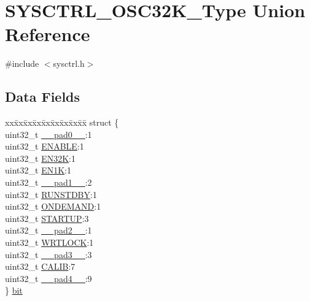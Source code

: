\hypertarget{union_s_y_s_c_t_r_l___o_s_c32_k___type}{}\section{S\+Y\+S\+C\+T\+R\+L\+\_\+\+O\+S\+C32\+K\+\_\+\+Type Union Reference}
\label{union_s_y_s_c_t_r_l___o_s_c32_k___type}


{\ttfamily \#include $<$sysctrl.\+h$>$}

\subsection*{Data Fields}
\begin{DoxyCompactItemize}
\item 
\begin{tabbing}
xx\=xx\=xx\=xx\=xx\=xx\=xx\=xx\=xx\=\kill
struct \{\\
\>uint32\_t \mbox{\hyperlink{union_s_y_s_c_t_r_l___o_s_c32_k___type_a3e57c2ef1c3ffb36722f000cc1156824}{\_\_pad0\_\_}}:1\\
\>uint32\_t \mbox{\hyperlink{union_s_y_s_c_t_r_l___o_s_c32_k___type_a66f979832c85e0692bd9422b05aff1f7}{ENABLE}}:1\\
\>uint32\_t \mbox{\hyperlink{union_s_y_s_c_t_r_l___o_s_c32_k___type_a51bee596c7082cd6a41e8ffc72d0f972}{EN32K}}:1\\
\>uint32\_t \mbox{\hyperlink{union_s_y_s_c_t_r_l___o_s_c32_k___type_aa24d798a72c55bfe5d16b3b239aaf38d}{EN1K}}:1\\
\>uint32\_t \mbox{\hyperlink{union_s_y_s_c_t_r_l___o_s_c32_k___type_a6712ba6dd1d5b43d2d56ff8ac4e275a7}{\_\_pad1\_\_}}:2\\
\>uint32\_t \mbox{\hyperlink{union_s_y_s_c_t_r_l___o_s_c32_k___type_a5656560aef3eaf5aac89b68b9fe39c3a}{RUNSTDBY}}:1\\
\>uint32\_t \mbox{\hyperlink{union_s_y_s_c_t_r_l___o_s_c32_k___type_a30dd338f916b14e723a50e2c5c2ad8f2}{ONDEMAND}}:1\\
\>uint32\_t \mbox{\hyperlink{union_s_y_s_c_t_r_l___o_s_c32_k___type_a76a7a1d661ec22c2e7e8b23392d0b86a}{STARTUP}}:3\\
\>uint32\_t \mbox{\hyperlink{union_s_y_s_c_t_r_l___o_s_c32_k___type_a9ce12a63de64ef64ae2d59d128251cae}{\_\_pad2\_\_}}:1\\
\>uint32\_t \mbox{\hyperlink{union_s_y_s_c_t_r_l___o_s_c32_k___type_a0598b70de2640e0db7e13bedc2fc280b}{WRTLOCK}}:1\\
\>uint32\_t \mbox{\hyperlink{union_s_y_s_c_t_r_l___o_s_c32_k___type_a4854608c0e776f0704a4d9a4b98ea57d}{\_\_pad3\_\_}}:3\\
\>uint32\_t \mbox{\hyperlink{union_s_y_s_c_t_r_l___o_s_c32_k___type_a95f06de3371ee421b89d4be2aae51561}{CALIB}}:7\\
\>uint32\_t \mbox{\hyperlink{union_s_y_s_c_t_r_l___o_s_c32_k___type_a7b2edc85d90e34c4435951e1e5c59517}{\_\_pad4\_\_}}:9\\
\} \mbox{\hyperlink{union_s_y_s_c_t_r_l___o_s_c32_k___type_ae716eb7cdb0c65620f57982664557c9e}{bit}}\\


\end{tabbing}
\end{DoxyCompactItemize}
